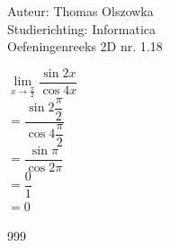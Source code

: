 \documentclass[a4paper]{article}
\begin{document}
\noindent \large Auteur: Thomas Olszowka \\
\noindent \large Studierichting: Informatica \\
\noindent \large Oefeningenreeks 2D nr. 1.18 \\



\medskip

\normalsize

$\lim\limits_{x \rightarrow \tfrac{\pi}{2}} \dfrac{\sin 2x}{\cos 4x}$ \\

$= \dfrac{\sin 2\dfrac{\pi}{2}}{\cos 4\dfrac{\pi}{2}}$ \\

$= \dfrac{\sin \pi}{\cos 2\pi}$ \\

$= \dfrac{0}{1}$ \\

$= 0$ \\

\begin{thebibliography}{999}
\end{thebibliography}
\end{document}
